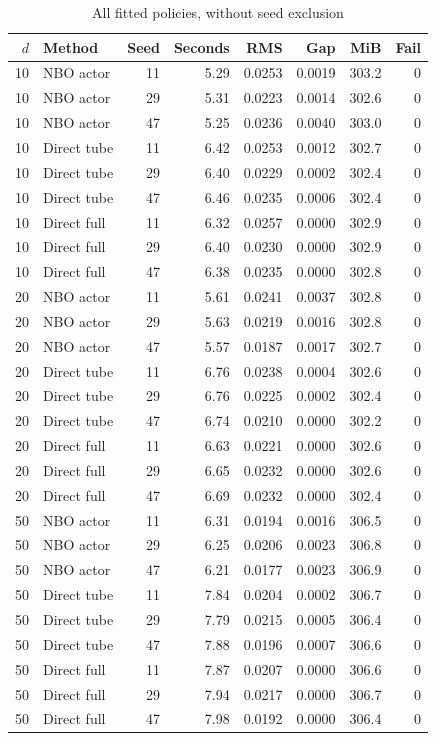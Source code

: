 \begin{longtable}{rlrrrrrr}
\caption{All fitted policies, without seed exclusion}\label{tab:r10allfits}\\
\toprule
$d$ & Method & Seed & Seconds & RMS & Gap & MiB & Fail\\
\midrule\endhead
10 & NBO actor & 11 & 5.29 & 0.0253 & 0.0019 & 303.2 & 0\\
10 & NBO actor & 29 & 5.31 & 0.0223 & 0.0014 & 302.6 & 0\\
10 & NBO actor & 47 & 5.25 & 0.0236 & 0.0040 & 303.0 & 0\\
10 & Direct tube & 11 & 6.42 & 0.0253 & 0.0012 & 302.7 & 0\\
10 & Direct tube & 29 & 6.40 & 0.0229 & 0.0002 & 302.4 & 0\\
10 & Direct tube & 47 & 6.46 & 0.0235 & 0.0006 & 302.4 & 0\\
10 & Direct full & 11 & 6.32 & 0.0257 & 0.0000 & 302.9 & 0\\
10 & Direct full & 29 & 6.40 & 0.0230 & 0.0000 & 302.9 & 0\\
10 & Direct full & 47 & 6.38 & 0.0235 & 0.0000 & 302.8 & 0\\
20 & NBO actor & 11 & 5.61 & 0.0241 & 0.0037 & 302.8 & 0\\
20 & NBO actor & 29 & 5.63 & 0.0219 & 0.0016 & 302.8 & 0\\
20 & NBO actor & 47 & 5.57 & 0.0187 & 0.0017 & 302.7 & 0\\
20 & Direct tube & 11 & 6.76 & 0.0238 & 0.0004 & 302.6 & 0\\
20 & Direct tube & 29 & 6.76 & 0.0225 & 0.0002 & 302.4 & 0\\
20 & Direct tube & 47 & 6.74 & 0.0210 & 0.0000 & 302.2 & 0\\
20 & Direct full & 11 & 6.63 & 0.0221 & 0.0000 & 302.6 & 0\\
20 & Direct full & 29 & 6.65 & 0.0232 & 0.0000 & 302.6 & 0\\
20 & Direct full & 47 & 6.69 & 0.0232 & 0.0000 & 302.4 & 0\\
50 & NBO actor & 11 & 6.31 & 0.0194 & 0.0016 & 306.5 & 0\\
50 & NBO actor & 29 & 6.25 & 0.0206 & 0.0023 & 306.8 & 0\\
50 & NBO actor & 47 & 6.21 & 0.0177 & 0.0023 & 306.9 & 0\\
50 & Direct tube & 11 & 7.84 & 0.0204 & 0.0002 & 306.7 & 0\\
50 & Direct tube & 29 & 7.79 & 0.0215 & 0.0005 & 306.4 & 0\\
50 & Direct tube & 47 & 7.88 & 0.0196 & 0.0007 & 306.6 & 0\\
50 & Direct full & 11 & 7.87 & 0.0207 & 0.0000 & 306.6 & 0\\
50 & Direct full & 29 & 7.94 & 0.0217 & 0.0000 & 306.7 & 0\\
50 & Direct full & 47 & 7.98 & 0.0192 & 0.0000 & 306.4 & 0\\
\bottomrule
\end{longtable}
